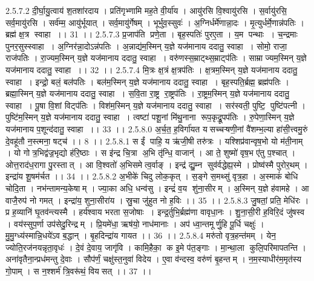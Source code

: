 2.5.7.2
दी॒र्घा॒यु॒त्वाय॑ श॒तशा॑रदाय । प्रति॑गृभ्णामि मह॒ते वी॒र्या॑य । आयु॑रसि वि॒श्वायु॑रसि । स॒र्वायु॑रसि॒ सर्व॒मायु॑रसि । सर्व॑म्म॒ आयु॑र्भूयात् । सर्व॒मायु॑र्गेषम् । भूर्भुव॒स्सुवः॑ । अ॒ग्निर्धर्मे॑णान्ना॒दः । मृ॒त्युर्धर्मे॒णान्न॑पतिः । ब्रह्म॑ क्ष॒त्र स्वाहा ।। 31 ।।
2.5.7.3
प्र॒जाप॑ति प्रणे॒ता । बृह॒स्पतिः॑ पुरए॒ता । य॒म पन्थाः । च॒न्द्रमाः पुनर॒सुस्स्वाहा । अ॒ग्निर॑न्ना॒दोऽन्न॑पतिः । अ॒न्नाद्य॑म॒स्मिन् य॒ज्ञे यज॑मानाय ददातु॒ स्वाहा । सोमो॒ राजा॒ राज॑पतिः । रा॒ज्यम॒स्मिन् य॒ज्ञे यज॑मानाय ददातु॒ स्वाहा । वरु॑णस्स॒म्राट्थ्स॒म्राट्प॑तिः । साम्राज्यम॒स्मिन् य॒ज्ञे यज॑मानाय ददातु॒ स्वाहा ।। 32 ।।
2.5.7.4
मि॒त्रः क्ष॒त्रं क्ष॒त्रप॑तिः । क्ष॒त्रम॒स्मिन् य॒ज्ञे यज॑मानाय ददातु॒ स्वाहा । इन्द्रो॒ बलं॒ बल॑पतिः । बल॑म॒स्मिन् य॒ज्ञे यज॑मानाय ददातु॒ स्वाहा । बृह॒स्पति॒र्ब्रह्म॒ ब्रह्म॑पतिः । ब्रह्मा॒स्मिन् य॒ज्ञे यज॑मानाय ददातु॒ स्वाहा । स॒वि॒ता रा॒ष्ट्र रा॒ष्ट्रप॑तिः । रा॒ष्ट्रम॒स्मिन् य॒ज्ञे यज॑मानाय ददातु॒ स्वाहा । पू॒षा वि॒शां विट्प॑तिः । विश॑म॒स्मिन् य॒ज्ञे यज॑मानाय ददातु॒ स्वाहा । सर॑स्वती॒ पुष्टि॒ पुष्टि॑पत्नी । पुष्टि॑म॒स्मिन् य॒ज्ञे यज॑मानाय ददातु॒ स्वाहा । त्वष्टा॑ पशू॒नां मि॑थु॒नाना॑ रूप॒कृद्रू॒पप॑तिः । रु॒पेणा॒स्मिन् य॒ज्ञे यज॑मानाय प॒शून्द॑दातु॒ स्वाहा ।। 33 ।।
2.5.8.0
अ॒र्च॒त॒ ह॒विर्गा॑यत यसच्चऱ्षणी॒नां वै॑शम्भ॒ल्या हा॑सी॒त्त्वमु॒रुं दे॒वहू॑तौ न॒स्त्मना॒ षट्च॑ ।। 8 ।।
2.5.8.1
स ईं पाहि॒ य ऋ॑जी॒षी तरु॑त्रः । यश्शिप्र॑वान्वृष॒भो यो म॑ती॒नाम् । यो गोत्र॒भिद्व॑ज्र॒भृद्यो ह॑रि॒ष्ठाः । स इ॑न्द्र चि॒त्रा अ॒भि तृ॑न्धि॒ वाजान्॑ । आ ते॒ शुष्मो॑ वृष॒भ ए॑तु प॒श्चात् । ओत्त॒राद॑ध॒रागा पु॒रस्तात् । आ वि॒श्वतो॑ अ॒भिसमेत्व॒र्वाङ् । इन्द्र॑ द्यु॒म्न सुव॑र्वद्धेह्य॒स्मे । प्रोष्व॑स्मै पुरोर॒थम् । इन्द्रा॑य शू॒षम॑र्चत ।। 34 ।।
2.5.8.2
अ॒भीके॑ चिदु लोक॒कृत् । स॒ङ्गे स॒मथ्सु॑ वृत्र॒हा । अ॒स्माकं॑ बोधि चोदि॒ता । नभ॑न्तामन्य॒केषाम् । ज्या॒का अधि॒ धन्व॑सु । इन्द्रं॑ व॒य शु॑ना॒सीरम् । अ॒स्मिन् य॒ज्ञे ह॑वामहे । आ वाजै॒रुप॑ नो गमत् । इन्द्रा॑य॒ शुना॒सीरा॑य । स्रु॒चा जु॑हुत नो ह॒विः ।। 35 ।।
2.5.8.3
जु॒षतां॒ प्रति॒ मेधि॑रः । प्र ह॒व्यानि॑ घृ॒तव॑न्त्यस्मै । हर्य॑श्वाय भरता स॒जोषाः । इन्द्र॒र्तुभि॒र्ब्रह्म॑णा वावृधा॒नः । शु॒ना॒सी॒री ह॒विरि॒दं जु॑षस्व । वय॑स्सुप॒र्णा उप॑सेदु॒रिन्द्रम् । प्रि॒यमे॑धा॒ ऋष॑यो॒ नाध॑मानाः । अप॑ ध्वा॒न्तमूर्णु॒हि पू॒र्धि चक्षुः॑ । मु॒मु॒ग्ध्य॑स्मान्नि॒धये॑ऽव ब॒द्धान् । बृ॒हदिन्द्रा॑य गायत ।। 36 ।।
2.5.8.4
मरु॑तो वृत्र॒हन्त॑मम् । येन॒ ज्योति॒रज॑नयन्नृता॒वृधः॑ । दे॒वं दे॒वाय॒ जागृ॑वि । कामि॒हैका॒ क इ॒मे प॑त॒ङ्गाः । मा॒न्था॒ला कुलि॒परि॑मापतन्ति । अना॑वृतैना॒न्प्रध॑मन्तु दे॒वाः । सौप॑र्णं॒ चक्षु॑स्त॒नुवा॑ विदेय । ए॒वा व॑न्दस्व॒ वरु॑णं बृ॒हन्तम् । न॒म॒स्याधीर॑म॒मृत॑स्य गो॒पाम् । स न॒श्शर्म॑ त्रि॒वरू॑थं॒ विय॑सत् ।। 37 ।।
